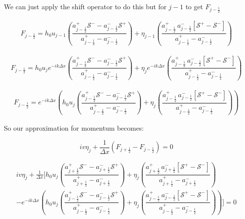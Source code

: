 \documentclass[12pt]{article}
\begin{document}
We can just apply the shift operator to do this but for $j-1$ to get $F_{j-\frac{1}{2}}$

\begin{gather}
F_{j-\frac{1}{2}} = h_0u_{j-1} \left(\dfrac{a^+_{j-\frac{1}{2}} \mathcal{S^-} - a^-_{j-\frac{1}{2}} \mathcal{S^+} }{a^+_{j-\frac{1}{2}} - a^-_{j-\frac{1}{2}}}\right)   + \eta_{j-1}  \left(\dfrac{a^+_{j-\frac{1}{2}} \, a^-_{j-\frac{1}{2}}\left [ \mathcal{S^+} -\mathcal{S^-} \right ] }{a^+_{j-\frac{1}{2}} - a^-_{j-\frac{1}{2}}}\right) 
\end{gather}

\begin{gather}
F_{j-\frac{1}{2}} = h_0u_{j}e^{-ik\Delta x} \left(\dfrac{a^+_{j-\frac{1}{2}} \mathcal{S^-} - a^-_{j-\frac{1}{2}} \mathcal{S^+} }{a^+_{j-\frac{1}{2}} - a^-_{j-\frac{1}{2}}}\right)   + \eta_{j}e^{-ik\Delta x}  \left(\dfrac{a^+_{j-\frac{1}{2}} \, a^-_{j-\frac{1}{2}}\left [ \mathcal{S^+} -\mathcal{S^-} \right ] }{a^+_{j-\frac{1}{2}} - a^-_{j-\frac{1}{2}}}\right) 
\end{gather}

\begin{gather}
F_{j-\frac{1}{2}} = e^{-ik\Delta x}\left(h_0u_{j} \left(\dfrac{a^+_{j-\frac{1}{2}} \mathcal{S^-} - a^-_{j-\frac{1}{2}} \mathcal{S^+} }{a^+_{j-\frac{1}{2}} - a^-_{j-\frac{1}{2}}}\right)   + \eta_{j} \left(\dfrac{a^+_{j-\frac{1}{2}} \, a^-_{j-\frac{1}{2}}\left [ \mathcal{S^+} -\mathcal{S^-} \right ] }{a^+_{j-\frac{1}{2}} - a^-_{j-\frac{1}{2}}}\right)\right) 
\end{gather}

So our approximation for momentum becomes:

\[iv\eta_j + \frac{1}{\Delta x} \left( F_{j+\frac{1}{2}} - F_{j-\frac{1}{2}} \right) = 0\]

\begin{multline}
iv\eta_j + \frac{1}{\Delta x} [ h_0u_j \left(\dfrac{a^+_{j+\frac{1}{2}} \mathcal{S^-} - a^-_{j+\frac{1}{2}} \mathcal{S^+} }{a^+_{j+\frac{1}{2}} - a^-_{j+\frac{1}{2}}}\right)   + \eta_{j}  \left(\dfrac{a^+_{j+\frac{1}{2}} \, a^-_{j+\frac{1}{2}}\left [ \mathcal{S^+} -\mathcal{S^-} \right ] }{a^+_{j+\frac{1}{2}} - a^-_{j+\frac{1}{2}}}\right) \\- e^{-ik\Delta x}\left(h_0u_{j} \left(\dfrac{a^+_{j-\frac{1}{2}} \mathcal{S^-} - a^-_{j-\frac{1}{2}} \mathcal{S^+} }{a^+_{j-\frac{1}{2}} - a^-_{j-\frac{1}{2}}}\right)   + \eta_{j} \left(\dfrac{a^+_{j-\frac{1}{2}} \, a^-_{j-\frac{1}{2}}\left [ \mathcal{S^+} -\mathcal{S^-} \right ] }{a^+_{j-\frac{1}{2}} - a^-_{j-\frac{1}{2}}}\right)\right) ] = 0
\end{multline}
\end{document}
